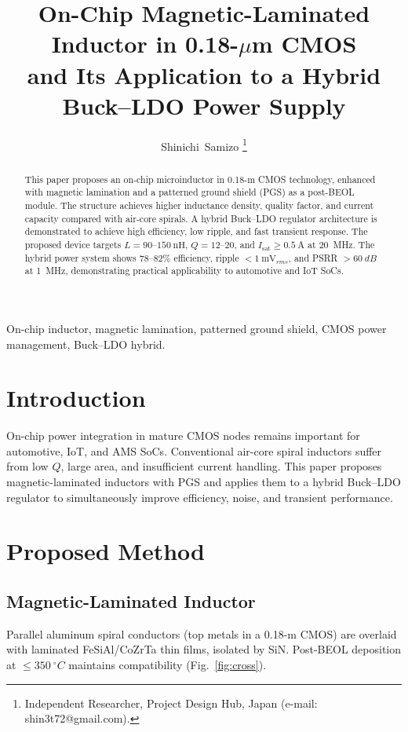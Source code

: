 \documentclass[journal]{IEEEtran}
\title{On-Chip Magnetic-Laminated Inductor in 0.18-$\mu$m CMOS\\
and Its Application to a Hybrid Buck--LDO Power Supply}
\author{Shinichi~Samizo%
\thanks{Independent Researcher, Project Design Hub, Japan (e-mail: shin3t72@gmail.com).}%
}
\begin{document}
\maketitle

\begin{abstract}
This paper proposes an on-chip microinductor in 0.18-\textmu m CMOS technology, enhanced with magnetic lamination and a patterned ground shield (PGS) as a post-BEOL module. The structure achieves higher inductance density, quality factor, and current capacity compared with air-core spirals. A hybrid Buck--LDO regulator architecture is demonstrated to achieve high efficiency, low ripple, and fast transient response. The proposed device targets $L=90$--$150~\mathrm{nH}$, $Q=12$--$20$, and $I_\mathrm{sat}\ge 0.5~\mathrm{A}$ at \SI{20}{\mega\hertz}. The hybrid power system shows $78$--$82\%$ efficiency, ripple $<\SI{1}{\milli\volt_{rms}}$, and PSRR $>\SI{60}{dB}$ at \SI{1}{\mega\hertz}, demonstrating practical applicability to automotive and IoT SoCs.
\end{abstract}

\begin{IEEEkeywords}
On-chip inductor, magnetic lamination, patterned ground shield, CMOS power management, Buck--LDO hybrid.
\end{IEEEkeywords}

\section{Introduction}
On-chip power integration in mature CMOS nodes remains important for automotive, IoT, and AMS SoCs. Conventional air-core spiral inductors suffer from low $Q$, large area, and insufficient current handling. This paper proposes magnetic-laminated inductors with PGS and applies them to a hybrid Buck--LDO regulator to simultaneously improve efficiency, noise, and transient performance.

\section{Proposed Method}
\subsection{Magnetic-Laminated Inductor}
Parallel aluminum spiral conductors (top metals in a 0.18-\textmu m CMOS) are overlaid with laminated FeSiAl/CoZrTa thin films, isolated by SiN. Post-BEOL deposition at $\le \SI{350}{^\circ C}$ maintains compatibility (Fig.~\ref{fig:cross}).
\end{document}
